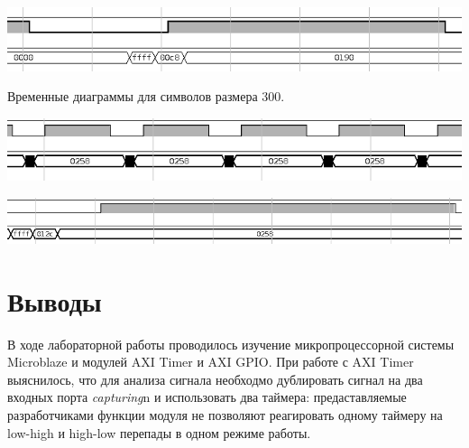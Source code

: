 \documentclass[12pt, a4paper] {ncc}
\begin{document}
	\includegraphics[scale=0.5]{./d_400_2.png}

	Временные диаграммы для символов размера 300.

	\includegraphics[scale=0.5]{./d_600.png}

	\includegraphics[scale=0.5]{./d_600_2.png}


\section{Выводы}

В ходе лабораторной работы проводилось изучение микропроцессорной системы Microblaze и
модулей AXI Timer и AXI GPIO. При работе с AXI Timer выяснилось, что для анализа сигнала
необходмо дублировать сигнал на два входных порта \textit{capturing}n и использовать
два таймера: предаставляемые разработчиками функции модуля не позволяют реагировать
одному таймеру на low-high и high-low перепады в одном режиме работы.


 
\end{document}
